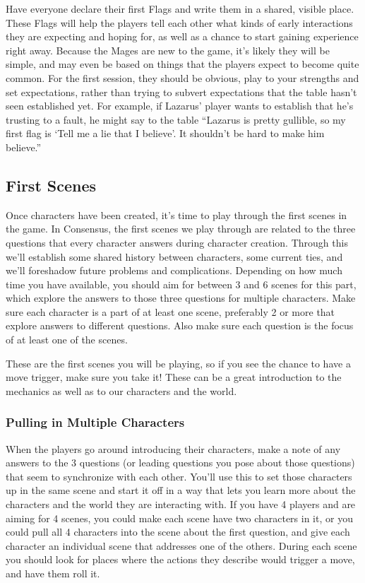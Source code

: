 \documentclass[
]{article}
\begin{document}
Have everyone declare their first Flags and write them in a shared,
visible place. These Flags will help the players tell each other what
kinds of early interactions they are expecting and hoping for, as well
as a chance to start gaining experience right away. Because the Mages
are new to the game, it's likely they will be simple, and may even be
based on things that the players expect to become quite common. For the
first session, they should be obvious, play to your strengths and set
expectations, rather than trying to subvert expectations that the table
hasn't seen established yet. For example, if Lazarus' player wants to
establish that he's trusting to a fault, he might say to the table
``Lazarus is pretty gullible, so my first flag is `Tell me a lie that I
believe'. It shouldn't be hard to make him believe.''

\hypertarget{first-scenes}{%
\subsection{First Scenes}\label{first-scenes}}

Once characters have been created, it's time to play through the first
scenes in the game. In Consensus, the first scenes we play through are
related to the three questions that every character answers during
character creation. Through this we'll establish some shared history
between characters, some current ties, and we'll foreshadow future
problems and complications. Depending on how much time you have
available, you should aim for between 3 and 6 scenes for this part,
which explore the answers to those three questions for multiple
characters. Make sure each character is a part of at least one scene,
preferably 2 or more that explore answers to different questions. Also
make sure each question is the focus of at least one of the scenes.

These are the first scenes you will be playing, so if you see the chance
to have a move trigger, make sure you take it! These can be a great
introduction to the mechanics as well as to our characters and the
world.

\hypertarget{pulling-in-multiple-characters}{%
\subsubsection{Pulling in Multiple
Characters}\label{pulling-in-multiple-characters}}

When the players go around introducing their characters, make a note of
any answers to the 3 questions (or leading questions you pose about
those questions) that seem to synchronize with each other. You'll use
this to set those characters up in the same scene and start it off in a
way that lets you learn more about the characters and the world they are
interacting with. If you have 4 players and are aiming for 4 scenes, you
could make each scene have two characters in it, or you could pull all 4
characters into the scene about the first question, and give each
character an individual scene that addresses one of the others. During
each scene you should look for places where the actions they describe
would trigger a move, and have them roll it.
\end{document}
